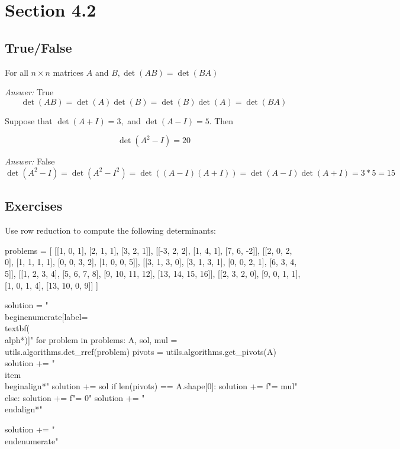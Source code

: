 \documentclass[letterpaper]{article}
\newcommand{\ans}{\textit{Answer: }}
\newenvironment{question}[2][Question]{\begin{trivlist}
\item[\hskip \labelsep {\bfseries #1}\hskip \labelsep {\bfseries #2.}]}{\end{trivlist}}
\begin{document}
\section{Section 4.2}
\subsection{True/False}

\begin{question}{4.9}
  For all $n \times n$ matrices $A$ and $B, \operatorname{det}(A B)=\operatorname{det}(B A)$

  \ans True
  $$\det(AB) = \det(A)\det(B) = \det(B)\det(A) = \det(BA)$$
  
\end{question}

\begin{question}{4.10}
  Suppose that $\operatorname{det}(A+I)=3,$ and $\operatorname{det}(A-I)=5 .$ Then

  $$
  \operatorname{det}\left(A^{2}-I\right)=20
  $$

  \ans False
  $$\det(A^2-I) = \det(A^2-I^2) = \det((A-I)(A+I)) = \det(A-I)\det(A+I) = 3*5 = 15$$
\end{question}

\subsection{Exercises}

\begin{question}{4.12}
  Use row reduction to compute the following determinants:
  
  \begin{pycode}
problems = [
  [[1, 0, 1], [2, 1, 1], [3, 2, 1]],
  [[-3, 2, 2], [1, 4, 1], [7, 6, -2]],
  [[2, 0, 2, 0], [1, 1, 1, 1], [0, 0, 3, 2], [1, 0, 0, 5]],
  [[3, 1, 3, 0], [3, 1, 3, 1], [0, 0, 2, 1], [6, 3, 4, 5]],
  [[1, 2, 3, 4], [5, 6, 7, 8], [9, 10, 11, 12], [13, 14, 15, 16]],
  [[2, 3, 2, 0], [9, 0, 1, 1], [1, 0, 1, 4], [13, 10, 0, 9]]
]

solution = "\\begin{enumerate}[label=\\textbf{(\\alph*)}]\n"
for problem in problems:
  A, sol, mul = utils.algorithms.det_rref(problem)
  pivots = utils.algorithms.get_pivots(A)
  solution += "\\item\\begin{align*}\n"
  solution += sol
  if len(pivots) == A.shape[0]:
    solution += f"= {mul}\n"
  else:
    solution += f"= 0\n"
  solution += "\\end{align*}\n"

solution += "\\end{enumerate}\n"
  \end{pycode}

  
\end{question}
\end{document}
